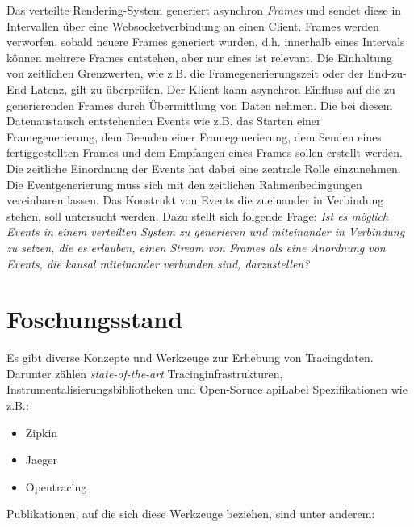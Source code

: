 	Das verteilte Rendering-System generiert asynchron \emph{Frames} und sendet diese in Intervallen über eine Websocketverbindung an einen Client. Frames werden verworfen, sobald neuere Frames generiert wurden, d.h. innerhalb eines Intervals können mehrere Frames entstehen, aber nur eines ist relevant. Die Einhaltung von zeitlichen Grenzwerten, wie z.B. die Framegenerierungszeit oder der End-zu-End Latenz, gilt zu überprüfen. Der Klient kann asynchron Einfluss auf die zu generierenden Frames durch Übermittlung von Daten nehmen. Die bei diesem Datenaustausch entstehenden Events wie z.B. das Starten einer Framegenerierung, dem Beenden einer Framegenerierung, dem Senden eines fertiggestellten Frames und dem Empfangen eines Frames sollen erstellt werden. Die zeitliche Einordnung der Events hat dabei eine zentrale Rolle einzunehmen. Die Eventgenerierung muss sich mit den zeitlichen Rahmenbedingungen vereinbaren lassen. Das Konstrukt von Events die zueinander in Verbindung stehen, soll untersucht werden. Dazu stellt sich folgende Frage: \emph{Ist es möglich Events in einem verteilten System zu generieren und miteinander in Verbindung zu setzen, die es erlauben, einen Stream von Frames als eine Anordnung von Events, die kausal miteinander verbunden sind, darzustellen?}
	
\section{Foschungsstand}
\label{section:Forschungsstand}

Es gibt diverse Konzepte und Werkzeuge zur Erhebung von Tracingdaten. Darunter zählen \emph{state-of-the-art} Tracinginfrastrukturen, Instrumentalisierungsbibliotheken und Open-Soruce \gls{apiLabel} Spezifikationen wie z.B.:
\begin{itemize}
	\item Zipkin
	\item Jaeger
	\item Opentracing
\end{itemize}

Publikationen, auf die sich diese Werkzeuge beziehen, sind unter anderem: 

